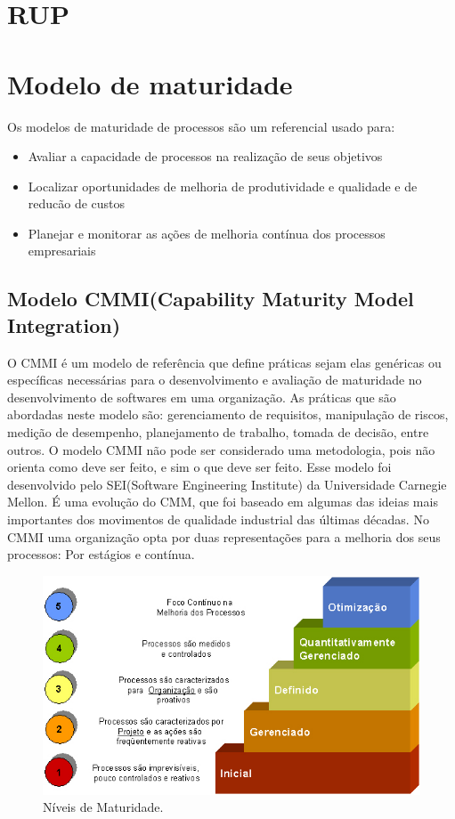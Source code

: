   \section{RUP}
  \section{Modelo de maturidade}
  Os modelos de maturidade de processos são um referencial usado para:
\begin{itemize}
\item Avaliar a capacidade de processos na realização de seus objetivos
\item Localizar oportunidades de melhoria de produtividade e qualidade e de reducão de custos
\item Planejar e monitorar as ações de melhoria contínua dos processos empresariais
\end{itemize}

  \subsection{Modelo CMMI(Capability Maturity Model Integration)}
  O CMMI é um modelo de referência que define práticas sejam elas genéricas ou específicas necessárias para o desenvolvimento e avaliação de maturidade no desenvolvimento de softwares em uma organização. As práticas que são abordadas neste modelo são: gerenciamento de requisitos, manipulação de riscos, medição de desempenho, planejamento de trabalho, tomada de decisão, entre outros. O modelo CMMI não pode ser considerado uma metodologia, pois não orienta como deve ser feito, e sim o que deve ser feito. Esse modelo foi desenvolvido pelo SEI(Software Engineering Institute) da Universidade Carnegie Mellon. É uma evolução do CMM, que foi baseado em algumas das ideias mais importantes dos movimentos de qualidade industrial das últimas décadas.
No CMMI uma organização opta por duas representações para a melhoria dos seus processos: Por estágios e contínua.
  \begin{figure}[!htbp]
    \centering
    \includegraphics[scale=0.5]{editaveis/figuras/cinco-niveis-maturidade-cmmi}
    \caption[Níveis de Maturidade]{Níveis de Maturidade. \footnotemark}
    \label{cinco-niveis-maturidade-cmmi}
  \end{figure}

